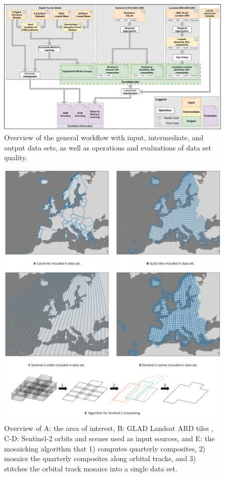 \begin{figure}[!hbt]
\centering
\includegraphics[width=1\textwidth]{figs_02/fig_1_main_workflow.png}
\caption{Overview of the general workflow with input, intermediate, and output data sets, as well as operations and evaluations of data set quality.}
\label{fig:1_methods_workflow}
\end{figure}


\begin{figure}
    \includegraphics[width=\linewidth]{figs_02/fig_2_study_area_satellite_input.png}
    \caption{Overview of A: the area of interest, B: GLAD Landsat ARD tiles , C-D: Sentinel-2 orbits and scenes used as input sources, and E: the mosaicking algorithm that 1) computes quarterly composites, 2) mosaics the quarterly composites along orbital tracks, and 3) stitches the orbital track mosaics into a single data set.} 
    \label{fig:2_study_area_satellite_input}
\end{figure}



